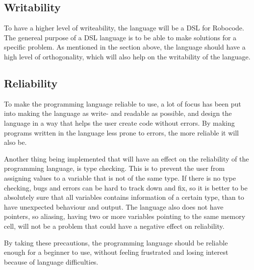 \subsection{Writability}
To have a higher level of writeability, the language will be a DSL for Robocode. The genereal purpose of a DSL language is to be able to make solutions for a specific problem. As mentioned in the section above, the language should have a high level of orthogonality, which will also help on  the writability of the language.  

\subsection{Reliability}
To make the programming language reliable to use, a lot of focus has been put into making the language as write- and readable as possible, and design the language in a way that helps the user create code without errors. By making programs written in the language less prone to errors, the more reliable it will also be.

Another thing being implemented that will have an effect on the reliability of the programming language, is type checking. This is to prevent the user from assigning values to a variable that is not of the same type. If there is no type checking, bugs and errors can be hard to track down and fix, so it is better to be absolutely sure that all variables contains information of a certain type, than to have unexpected behaviour and output. 
The language also does not have pointers, so aliasing, having two or more variables pointing to the same memory cell, will not be a problem that could have a negative effect on reliability.

By taking these precautions, the programming language should be reliable enough for a beginner to use, without feeling frustrated and losing interest because of language difficulties.



